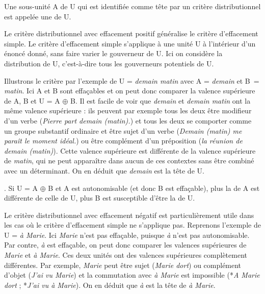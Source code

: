 {Une sous-unité A de U qui est identifiée comme tête par un critère distributionnel est appelée une  de U.}

Le critère distributionnel avec effacement positif généralise le critère d’effacement simple. Le critère d’effacement simple s’applique à une unité U à l’intérieur d’un énoncé donné, sans faire varier le gouverneur de U. Ici on considère la distribution de U, c’est-à-dire tous les gouverneurs potentiels de U.

Illustrons le critère par l’exemple de U = \textit{demain matin} avec A = \textit{demain} et B~= \textit{matin}. Ici A et B sont effaçables et on peut donc comparer la valence supérieure de A, B et U = A ${\oplus}$ B. Il est facile de voir que \textit{demain} et \textit{demain matin} ont la même valence supérieure : ils peuvent par exemple tous les deux être modifieur d'un verbe (\textit{Pierre part demain (matin).}) et tous les deux se comporter comme un groupe substantif ordinaire et être sujet d'un verbe (\textit{Demain (matin) me paraît le moment idéal.}) ou être complément d'un préposition (\textit{la réunion de demain (matin)}). Cette valence supérieure est différente de la valence supérieure de \textit{matin}, qui ne peut apparaître dans aucun de ces contextes sans être combiné avec un déterminant. On en déduit que \textit{demain} est la tête de U.

{. Si U = A ${\oplus}$ B et A est autonomisable (et donc B est effaçable),  plus la  de A est différente de celle de U, plus B est susceptible d'être la  de U.}

\begin{sloppypar}
Le critère distributionnel avec effacement négatif est particulièrement utile dans les cas où le critère d’effacement simple ne s’applique pas. Reprenons l’exemple de U = \textit{à Marie}. Ici \textit{Marie} n’est pas effaçable, puisque \textit{à} n’est pas autonomisable. Par contre, \textit{à} est effaçable, on peut donc comparer les valences supérieures de \textit{Marie} et \textit{à Marie}. Ces deux unités ont des valences supérieures complètement différentes. Par exemple, \textit{Marie} peut être sujet (\textit{Marie dort}) ou complément d’objet (\textit{J’ai vu Marie}) et la commutation avec \textit{à Marie} est impossible (*\textit{A Marie dort} ; *\textit{J’ai vu à Marie}). On en déduit que \textit{à} est la tête de \textit{à Marie}.
\end{sloppypar}

